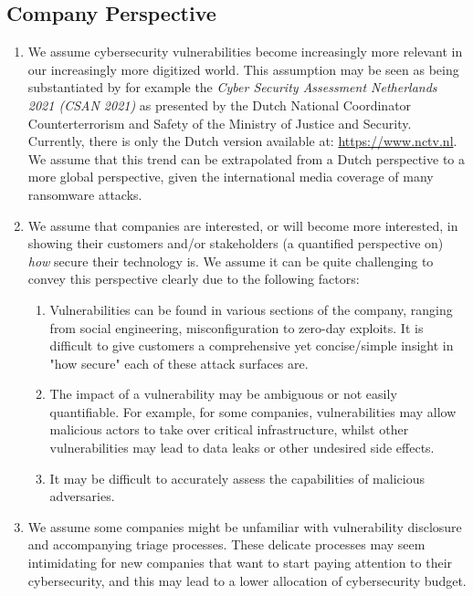 \subsection{Company Perspective}
\begin{enumerate}
	\item We assume cybersecurity vulnerabilities become increasingly more relevant in our increasingly more digitized world. This assumption may be seen as being substantiated by for example the \textit{Cyber Security Assessment Netherlands 2021 (CSAN 2021)} as presented by the Dutch National Coordinator Counterterrorism and Safety of the Ministry of Justice and Security. Currently, there is only the Dutch version available at: \href{https://www.nctv.nl/onderwerpen/cybersecuritybeeld-nederland/documenten/publicaties/2021/06/28/cybersecuritybeeld-nederland-2021}{https://www.nctv.nl}. We assume that this trend can be extrapolated from a Dutch perspective to a more global perspective, given the international media coverage of many ransomware attacks.
	\item We assume that companies are interested, or will become more interested, in showing their customers and/or stakeholders (a quantified perspective on) \textit{how} secure their technology is. We assume it can be quite challenging to convey this perspective clearly due to the following factors:
	\begin{enumerate}
		\item Vulnerabilities can be found in various sections of the company, ranging from social engineering, misconfiguration to zero-day exploits. It is difficult to give customers a comprehensive yet concise/simple insight in "how secure" each of these attack surfaces are.
		\item The impact of a vulnerability may be ambiguous or not easily quantifiable. For example, for some companies, vulnerabilities may allow malicious actors to take over critical infrastructure, whilst other vulnerabilities may lead to data leaks or other undesired side effects.
		\item It may be difficult to accurately assess the capabilities of malicious adversaries.
	\end{enumerate}
	\item We assume some companies might be unfamiliar with vulnerability disclosure and accompanying triage processes. These delicate processes may seem intimidating for new companies that want to start paying attention to their cybersecurity, and this may lead to a lower allocation of cybersecurity budget.
\end{enumerate}